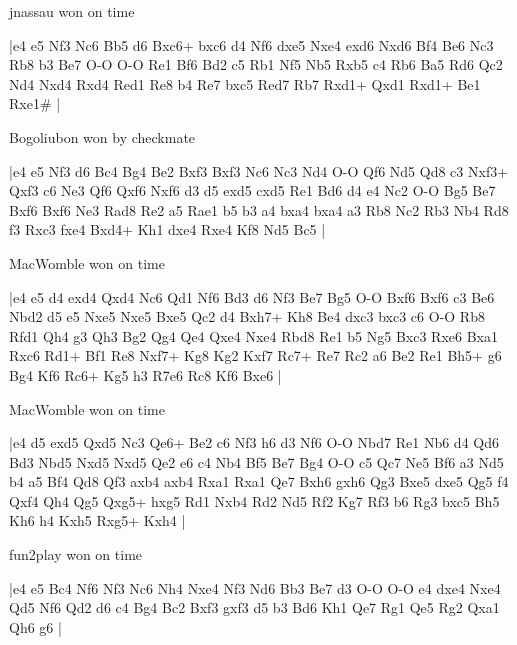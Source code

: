 \showboard

jnassau won on time

\makegametitle
|e4 e5 Nf3 Nc6 Bb5 d6 Bxc6+ bxc6 d4 Nf6 dxe5 Nxe4 exd6 Nxd6 Bf4 Be6 Nc3 Rb8 b3 Be7 O-O O-O Re1 Bf6 Bd2 c5 Rb1 Nf5 Nb5 Rxb5 c4 Rb6 Ba5 Rd6 Qc2 Nd4 Nxd4 Rxd4 Red1 Re8 b4 Re7 bxc5 Red7 Rb7 Rxd1+ Qxd1 Rxd1+ Be1 Rxe1\#  |

\showboard

Bogoliubon won by checkmate

\makegametitle
|e4 e5 Nf3 d6 Bc4 Bg4 Be2 Bxf3 Bxf3 Nc6 Nc3 Nd4 O-O Qf6 Nd5 Qd8 c3 Nxf3+ Qxf3 c6 Ne3 Qf6 Qxf6 Nxf6 d3 d5 exd5 cxd5 Re1 Bd6 d4 e4 Nc2 O-O Bg5 Be7 Bxf6 Bxf6 Ne3 Rad8 Re2 a5 Rae1 b5 b3 a4 bxa4 bxa4 a3 Rb8 Nc2 Rb3 Nb4 Rd8 f3 Rxc3 fxe4 Bxd4+ Kh1 dxe4 Rxe4 Kf8 Nd5 Bc5  |

\showboard

MacWomble won on time

\makegametitle
|e4 e5 d4 exd4 Qxd4 Nc6 Qd1 Nf6 Bd3 d6 Nf3 Be7 Bg5 O-O Bxf6 Bxf6 c3 Be6 Nbd2 d5 e5 Nxe5 Nxe5 Bxe5 Qc2 d4 Bxh7+ Kh8 Be4 dxc3 bxc3 c6 O-O Rb8 Rfd1 Qh4 g3 Qh3 Bg2 Qg4 Qe4 Qxe4 Nxe4 Rbd8 Re1 b5 Ng5 Bxc3 Rxe6 Bxa1 Rxc6 Rd1+ Bf1 Re8 Nxf7+ Kg8 Kg2 Kxf7 Rc7+ Re7 Rc2 a6 Be2 Re1 Bh5+ g6 Bg4 Kf6 Rc6+ Kg5 h3 R7e6 Rc8 Kf6 Bxe6  |

\showboard

MacWomble won on time

\makegametitle
|e4 d5 exd5 Qxd5 Nc3 Qe6+ Be2 c6 Nf3 h6 d3 Nf6 O-O Nbd7 Re1 Nb6 d4 Qd6 Bd3 Nbd5 Nxd5 Nxd5 Qe2 e6 c4 Nb4 Bf5 Be7 Bg4 O-O c5 Qc7 Ne5 Bf6 a3 Nd5 b4 a5 Bf4 Qd8 Qf3 axb4 axb4 Rxa1 Rxa1 Qe7 Bxh6 gxh6 Qg3 Bxe5 dxe5 Qg5 f4 Qxf4 Qh4 Qg5 Qxg5+ hxg5 Rd1 Nxb4 Rd2 Nd5 Rf2 Kg7 Rf3 b6 Rg3 bxc5 Bh5 Kh6 h4 Kxh5 Rxg5+ Kxh4  |

\showboard

fun2play won on time

\makegametitle
|e4 e5 Bc4 Nf6 Nf3 Nc6 Nh4 Nxe4 Nf3 Nd6 Bb3 Be7 d3 O-O O-O e4 dxe4 Nxe4 Qd5 Nf6 Qd2 d6 c4 Bg4 Bc2 Bxf3 gxf3 d5 b3 Bd6 Kh1 Qe7 Rg1 Qe5 Rg2 Qxa1 Qh6 g6  |

\showboard

